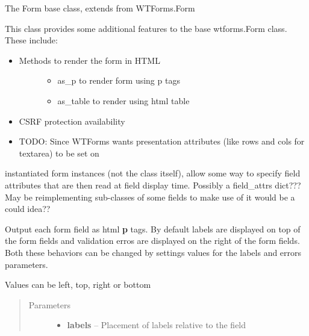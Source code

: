 \documentclass[letterpaper,10pt,english]{sphinxmanual}
\begin{document}
\begin{fulllineitems}
\label{pyck-forms:pyck.forms.Form}
The Form base class, extends from WTForms.Form

This class provides some additional features to the base wtforms.Form class. These include:
\begin{itemize}
\item {} \begin{description}
\item[{Methods to render the form in HTML}] \leavevmode\begin{itemize}
\item {} 
as\_p to render form using p tags

\item {} 
as\_table to render using html table

\end{itemize}

\end{description}

\item {} 
CSRF protection availability

\item {} 
TODO: Since WTForms wants presentation attributes (like rows and cols for textarea) to be set on

\end{itemize}

instantiated form instances (not the class itself), allow some way to specify field attributes
that are then read at field display time. Possibly a field\_attrs dict??? May be reimplementing sub-classes of some fields to make use of it would be a could idea??

\begin{fulllineitems}
\label{pyck-forms:pyck.forms.Form.as_p}
Output each form field as html \textbf{p} tags. By default labels are displayed on top of the form fields
and validation erros are displayed on the right of the form fields. Both these behaviors can be
changed by settings values for the labels and errors parameters.

Values can be left, top, right or bottom
\begin{quote}\begin{description}
\item[{Parameters}] \leavevmode\begin{itemize}
\item {} 
\textbf{labels} -- Placement of labels relative to the field


\end{itemize}
\end{description}
\end{quote}
\end{fulllineitems}
\end{fulllineitems}
\end{document}
